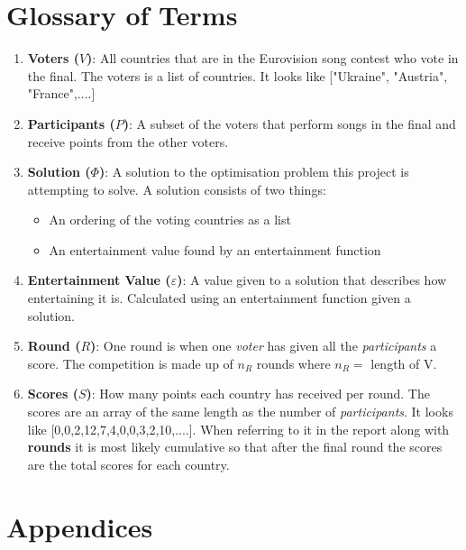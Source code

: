 \documentclass[12pt]{report}
\begin{document}
\section*{Glossary of Terms}\label{glossary}
\begin{enumerate}
\item \textbf{Voters ($V$)}: All countries that are in the Eurovision song contest who vote in the final. The voters is a list of countries. It looks like ["Ukraine", "Austria", "France",....]
\item \textbf{Participants ($P$)}: A subset of the voters that perform songs in the final and receive points from the other voters.
\item \textbf{Solution ($\Phi$)}: A solution to the optimisation problem this project is attempting to solve. A solution consists of two things:
	\begin{itemize}
		\item An ordering of the voting countries as a list
		\item An entertainment value found by an entertainment function
	\end{itemize}
\item \textbf{Entertainment Value ($\varepsilon$)}: A value given to a solution that describes how entertaining it is. Calculated using an entertainment function given a solution.
\item \textbf{Round ($R$)}: One round is when one \textit{voter} has given all the \textit{participants} a score. The competition is made up of $n_R$ rounds where $n_R = $ length of V.
\item \textbf{Scores ($S$)}: How many points each country has received per round. The scores are an array of the same length as the number of \textit{participants}. It looks like [0,0,2,12,7,4,0,0,3,2,10,....]. When referring to it in the report along with \textbf{rounds} it is most likely cumulative so that after the final round the scores are the total scores for each country.
\end{enumerate}


\section*{Appendices}
\end{document}
